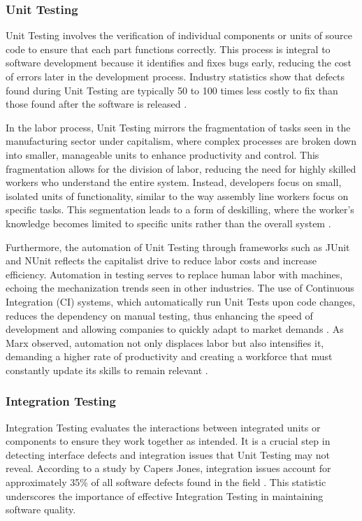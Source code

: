 \begin{refsection}
\subsubsection{Unit Testing}

Unit Testing involves the verification of individual components or units of source code to ensure that each part functions correctly. This process is integral to software development because it identifies and fixes bugs early, reducing the cost of errors later in the development process. Industry statistics show that defects found during Unit Testing are typically 50 to 100 times less costly to fix than those found after the software is released \cite[pp.~30-35]{kaner1999testing}.

In the labor process, Unit Testing mirrors the fragmentation of tasks seen in the manufacturing sector under capitalism, where complex processes are broken down into smaller, manageable units to enhance productivity and control. This fragmentation allows for the division of labor, reducing the need for highly skilled workers who understand the entire system. Instead, developers focus on small, isolated units of functionality, similar to the way assembly line workers focus on specific tasks. This segmentation leads to a form of deskilling, where the worker's knowledge becomes limited to specific units rather than the overall system \cite[pp.~88-92]{braverman1974labor}.

Furthermore, the automation of Unit Testing through frameworks such as JUnit and NUnit reflects the capitalist drive to reduce labor costs and increase efficiency. Automation in testing serves to replace human labor with machines, echoing the mechanization trends seen in other industries. The use of Continuous Integration (CI) systems, which automatically run Unit Tests upon code changes, reduces the dependency on manual testing, thus enhancing the speed of development and allowing companies to quickly adapt to market demands \cite[pp.~134-138]{fuchs2014digital}. As Marx observed, automation not only displaces labor but also intensifies it, demanding a higher rate of productivity and creating a workforce that must constantly update its skills to remain relevant \cite[pp.~490-499]{marx2008capital}.

\subsubsection{Integration Testing}

Integration Testing evaluates the interactions between integrated units or components to ensure they work together as intended. It is a crucial step in detecting interface defects and integration issues that Unit Testing may not reveal. According to a study by Capers Jones, integration issues account for approximately 35\% of all software defects found in the field \cite[pp.~145-149]{jones2012economics}. This statistic underscores the importance of effective Integration Testing in maintaining software quality.


\end{refsection}
